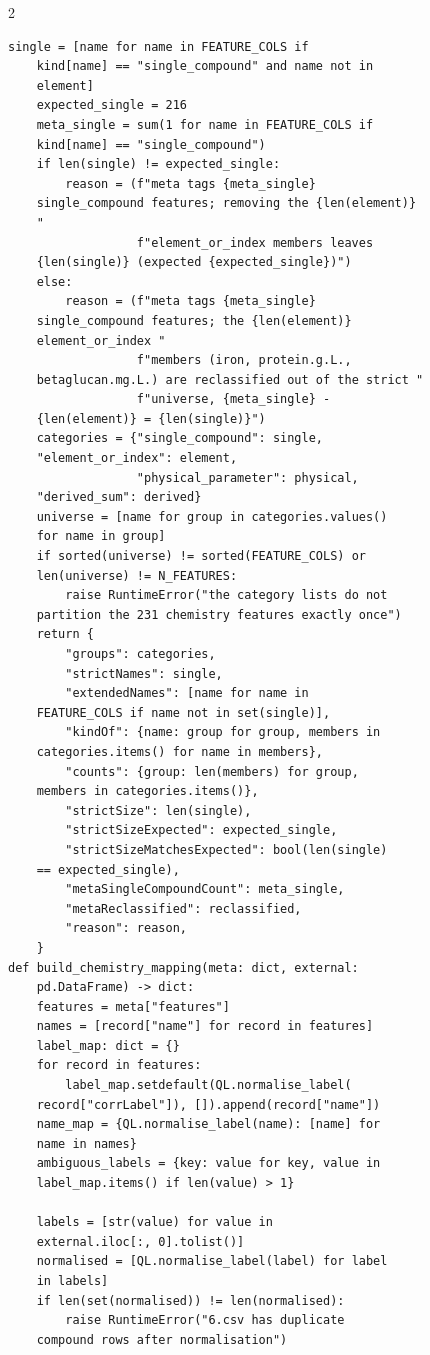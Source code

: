 \begin{multicols}{2}
\begin{Verbatim}[fontsize=\scriptsize]
    single = [name for name in FEATURE_COLS if
    kind[name] == "single_compound" and name not in
    element]
    expected_single = 216
    meta_single = sum(1 for name in FEATURE_COLS if
    kind[name] == "single_compound")
    if len(single) != expected_single:
        reason = (f"meta tags {meta_single}
    single_compound features; removing the {len(element)}
    "
                  f"element_or_index members leaves
    {len(single)} (expected {expected_single})")
    else:
        reason = (f"meta tags {meta_single}
    single_compound features; the {len(element)}
    element_or_index "
                  f"members (iron, protein.g.L.,
    betaglucan.mg.L.) are reclassified out of the strict "
                  f"universe, {meta_single} -
    {len(element)} = {len(single)}")
    categories = {"single_compound": single,
    "element_or_index": element,
                  "physical_parameter": physical,
    "derived_sum": derived}
    universe = [name for group in categories.values()
    for name in group]
    if sorted(universe) != sorted(FEATURE_COLS) or
    len(universe) != N_FEATURES:
        raise RuntimeError("the category lists do not
    partition the 231 chemistry features exactly once")
    return {
        "groups": categories,
        "strictNames": single,
        "extendedNames": [name for name in
    FEATURE_COLS if name not in set(single)],
        "kindOf": {name: group for group, members in
    categories.items() for name in members},
        "counts": {group: len(members) for group,
    members in categories.items()},
        "strictSize": len(single),
        "strictSizeExpected": expected_single,
        "strictSizeMatchesExpected": bool(len(single)
    == expected_single),
        "metaSingleCompoundCount": meta_single,
        "metaReclassified": reclassified,
        "reason": reason,
    }
def build_chemistry_mapping(meta: dict, external:
    pd.DataFrame) -> dict:
    features = meta["features"]
    names = [record["name"] for record in features]
    label_map: dict = {}
    for record in features:
        label_map.setdefault(QL.normalise_label(
    record["corrLabel"]), []).append(record["name"])
    name_map = {QL.normalise_label(name): [name] for
    name in names}
    ambiguous_labels = {key: value for key, value in
    label_map.items() if len(value) > 1}

    labels = [str(value) for value in
    external.iloc[:, 0].tolist()]
    normalised = [QL.normalise_label(label) for label
    in labels]
    if len(set(normalised)) != len(normalised):
        raise RuntimeError("6.csv has duplicate
    compound rows after normalisation")


\end{Verbatim}
\end{multicols}
